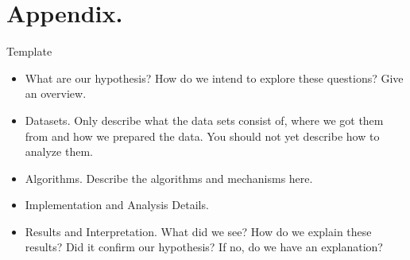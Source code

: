 \documentclass[nohyperref]{article}
\theoremstyle{plain}
\theoremstyle{definition}
\theoremstyle{remark}
\begin{document}
\section{Appendix.}

{\Huge Template}

\begin{itemize}
    \item What are our hypothesis? How do we intend to explore these questions? Give an overview.
    \item Datasets. Only describe what the data sets consist of, where we got them from and how we prepared the data. You should not yet describe how to analyze them. 
    \item Algorithms. Describe the algorithms and mechanisms here. 
    \item Implementation and Analysis Details. 
    \item Results and Interpretation. What did we see? How do we explain these results? Did it confirm our hypothesis? If no, do we have an explanation?
\end{itemize}
\end{document}
